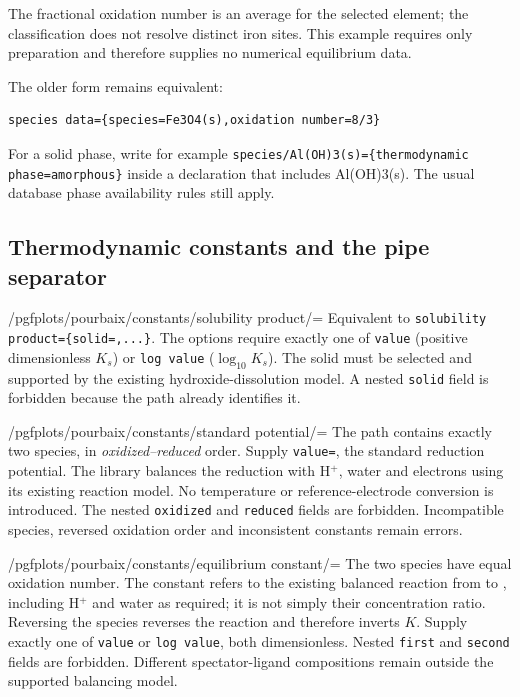 \documentclass[a4paper,11pt]{ltxdoc}
\begin{document}
\begin{codeexample}[width=6cm]
\end{codeexample}
The fractional oxidation number is an average for the selected element; the
classification does not resolve distinct iron sites. This example requires only
preparation and therefore supplies no numerical equilibrium data.

The older form remains equivalent:
\begin{verbatim}
species data={species=Fe3O4(s),oxidation number=8/3}
\end{verbatim}
For a solid phase, write for example
\texttt{species/Al(OH)3(s)=\{thermodynamic phase=amorphous\}} inside a declaration
that includes Al(OH)3(s). The usual database phase availability rules still apply.

\subsection{Thermodynamic constants and the pipe separator}
\begin{key}{/pgfplots/pourbaix/constants/solubility product/=}
Equivalent to \texttt{solubility product=\{solid=}\texttt{,...\}}.
The options require exactly one of \texttt{value} (positive dimensionless $K_s$)
or \texttt{log value} ($\log_{10}K_s$). The solid must be selected and supported
by the existing hydroxide-dissolution model. A nested \texttt{solid} field is
forbidden because the path already identifies it.
\end{key}
\begin{key}{/pgfplots/pourbaix/constants/standard potential/=}
The path contains exactly two species, in \emph{oxidized--reduced} order. Supply
\texttt{value=}, the standard reduction potential. The library balances
the reduction with H$^+$, water and electrons using its existing reaction model.
No temperature or reference-electrode conversion is introduced. The nested
\texttt{oxidized} and \texttt{reduced} fields are forbidden. Incompatible species,
reversed oxidation order and inconsistent constants remain errors.
\end{key}
\begin{key}{/pgfplots/pourbaix/constants/equilibrium constant/=}
The two species have equal oxidation number. The constant refers to the existing
balanced reaction from  to , including H$^+$ and water
as required; it is not simply their concentration ratio. Reversing the species
reverses the reaction and therefore inverts $K$. Supply exactly one of
\texttt{value} or \texttt{log value}, both dimensionless. Nested \texttt{first} and
\texttt{second} fields are forbidden. Different spectator-ligand compositions
remain outside the supported balancing model.
\end{key}
\end{document}
